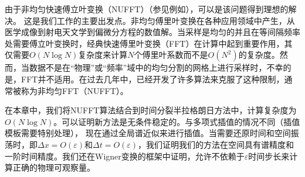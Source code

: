 
由于非均匀快速傅立叶变换（NUFFT）（参见例如），可以是该问题得到理想的解决。
这是我们工作的主要出发点。非均匀傅里叶变换在各种应用领域中产生，从医学成像到射电天文学到偏微分方程的数值解。当采样是均匀的并且在等间隔频率处需要傅立叶变换时，经典快速傅里叶变换（FFT）在计算中起到重要作用，其仅需要$O(N\log N)$复杂度来计算$N$个傅里叶系数而不是$O(N^2)$的复杂度。然而，当数据不是在“物理”或“频率”域中的均匀分割的网格上进行采样时，不幸的是，FFT并不适用。在过去几年中，已经开发了许多算法来克服了这种限制，通常被称为非均匀FFT（NUFFT）。




在本章中，我们将NUFFT算法结合到时间分裂半拉格朗日方法中，计算复杂度为$O(N \log N)$。可以证明新方法是无条件稳定的。与多项式插值的情况不同（插值模板需要特别处理），
现在通过全局谱近似来进行插值。当需要还原时间和空间振荡时，即$\Delta x = O(\varepsilon)$和$\Delta t = O(\varepsilon)$，我们证明我们的方法在空间具有谱精度和一阶时间精度。我们还在Wigner变换的框架中证明，允许不依赖于$\varepsilon$时间步长来计算正确的物理可观察量。

